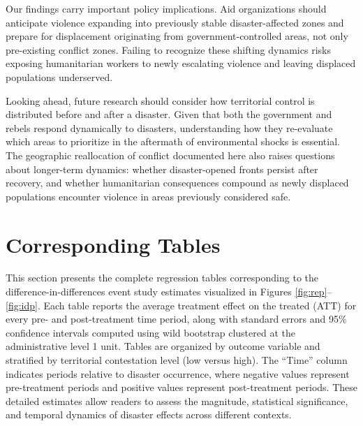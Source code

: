 \documentclass[bibtex]{article}
\begin{document}
{Our findings carry important policy implications. Aid organizations should anticipate violence expanding into previously stable disaster-affected zones and prepare for displacement originating from government-controlled areas, not only pre-existing conflict zones. Failing to recognize these shifting dynamics risks exposing humanitarian workers to newly escalating violence and leaving displaced populations underserved.



{\color{black} Looking ahead,} future research should consider how territorial control is distributed before and after a disaster. Given that both the government and rebels respond dynamically to disasters, {\color{black} understanding how they re-evaluate which areas to prioritize in the aftermath of environmental shocks is essential. The geographic reallocation of conflict documented here also raises questions about longer-term dynamics: whether disaster-opened fronts persist after recovery, and whether humanitarian consequences compound as newly displaced populations encounter violence in areas previously considered safe.}



\newpage
\setcounter{page}{1}
\setcounter{section}{0}
\renewcommand{\thesection}{\Alph{section}}
\renewcommand{\thesubsection}{\Alph{section}.\arabic{subsection}}
\renewcommand{\thefigure}{\Alph{section}.\arabic{figure}}
\renewcommand{\thetable}{\Alph{section}.\arabic{table}}

\titleformat{\section}{\sffamily\bfseries\large\raggedright}{Appendix \thesection:}{0.5em}{\MakeTextUppercase{#1}}
\setcounter{figure}{0}
\setcounter{table}{0}
\singlespacing


\section{Corresponding Tables}\label{ap:maintabs}

This section presents the complete regression tables corresponding to the difference-in-differences event study estimates visualized in Figures \ref{fig:rep}--\ref{fig:idp}. Each table reports the average treatment effect on the treated (ATT) for every pre- and post-treatment time period, along with standard errors and 95\% confidence intervals computed using wild bootstrap clustered at the administrative level 1 unit. Tables are organized by outcome variable and stratified by territorial contestation level (low versus high). The ``Time'' column indicates periods relative to disaster occurrence, where negative values represent pre-treatment periods and positive values represent post-treatment periods. These detailed estimates allow readers to assess the magnitude, statistical significance, and temporal dynamics of disaster effects across different contexts.

}
\end{document}

